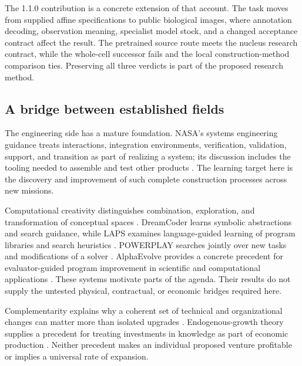 The 1.1.0 contribution is a concrete extension of that account. The task moves from supplied affine specifications to public biological images, where annotation decoding, observation meaning, specialist model stock, and a changed acceptance contract affect the result. The pretrained source route meets the nucleus research contract, while the whole-cell successor fails and the local construction-method comparison ties. Preserving all three verdicts is part of the proposed research method.

\subsection{A bridge between established fields}

The engineering side has a mature foundation. NASA's systems engineering guidance treats interactions, integration environments, verification, validation, support, and transition as part of realizing a system; its discussion includes the tooling needed to assemble and test other products \citep{nasaSE}. The learning target here is the discovery and improvement of such complete construction processes across new missions.

Computational creativity distinguishes combination, exploration, and transformation of conceptual spaces \citep{boden1998}. DreamCoder learns symbolic abstractions and search guidance, while LAPS examines language-guided learning of program libraries and search heuristics \citep{ellis2020,wong2021}. POWERPLAY searches jointly over new tasks and modifications of a solver \citep{schmidhuber2011}. AlphaEvolve provides a concrete precedent for evaluator-guided program improvement in scientific and computational applications \citep{novikov2025}. These systems motivate parts of the agenda. Their results do not supply the untested physical, contractual, or economic bridges required here.

Complementarity explains why a coherent set of technical and organizational changes can matter more than isolated upgrades \citep{milgrom1990}. Endogenous-growth theory supplies a precedent for treating investments in knowledge as part of economic production \citep{romer1990}. Neither precedent makes an individual proposed venture profitable or implies a universal rate of expansion.

